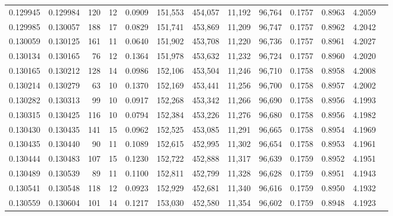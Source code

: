 \begin{tabular}{rrrrrrrrrrrrr}
0.129945 & 0.129984 &   120 &  12 &                                     0.0909 & 151,553 & 454,057 &  11,192 &  96,764 & 0.1757 & 0.8963 & 4.2059 \\
0.129985 & 0.130057 &   188 &  17 &                                     0.0829 & 151,741 & 453,869 &  11,209 &  96,747 & 0.1757 & 0.8962 & 4.2042 \\
0.130059 & 0.130125 &   161 &  11 &                                     0.0640 & 151,902 & 453,708 &  11,220 &  96,736 & 0.1757 & 0.8961 & 4.2027 \\
0.130134 & 0.130165 &    76 &  12 &                                     0.1364 & 151,978 & 453,632 &  11,232 &  96,724 & 0.1757 & 0.8960 & 4.2020 \\
0.130165 & 0.130212 &   128 &  14 &                                     0.0986 & 152,106 & 453,504 &  11,246 &  96,710 & 0.1758 & 0.8958 & 4.2008 \\
0.130214 & 0.130279 &    63 &  10 &                                     0.1370 & 152,169 & 453,441 &  11,256 &  96,700 & 0.1758 & 0.8957 & 4.2002 \\
0.130282 & 0.130313 &    99 &  10 &                                     0.0917 & 152,268 & 453,342 &  11,266 &  96,690 & 0.1758 & 0.8956 & 4.1993 \\
0.130315 & 0.130425 &   116 &  10 &                                     0.0794 & 152,384 & 453,226 &  11,276 &  96,680 & 0.1758 & 0.8956 & 4.1982 \\
0.130430 & 0.130435 &   141 &  15 &                                     0.0962 & 152,525 & 453,085 &  11,291 &  96,665 & 0.1758 & 0.8954 & 4.1969 \\
0.130435 & 0.130440 &    90 &  11 &                                     0.1089 & 152,615 & 452,995 &  11,302 &  96,654 & 0.1758 & 0.8953 & 4.1961 \\
0.130444 & 0.130483 &   107 &  15 &                                     0.1230 & 152,722 & 452,888 &  11,317 &  96,639 & 0.1759 & 0.8952 & 4.1951 \\
0.130489 & 0.130539 &    89 &  11 &                                     0.1100 & 152,811 & 452,799 &  11,328 &  96,628 & 0.1759 & 0.8951 & 4.1943 \\
0.130541 & 0.130548 &   118 &  12 &                                     0.0923 & 152,929 & 452,681 &  11,340 &  96,616 & 0.1759 & 0.8950 & 4.1932 \\
0.130559 & 0.130604 &   101 &  14 &                                     0.1217 & 153,030 & 452,580 &  11,354 &  96,602 & 0.1759 & 0.8948 & 4.1923 \\

\end{tabular}
